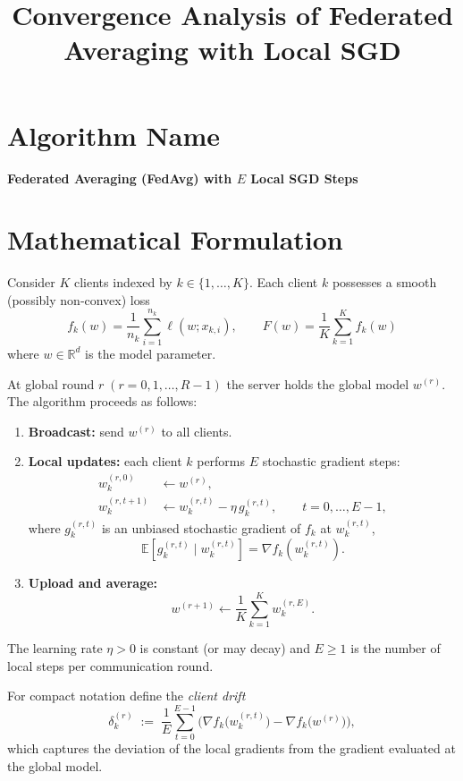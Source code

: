 \documentclass{article}
\title{Convergence Analysis of Federated Averaging with Local SGD}
\author{}
\date{}
\newcommand{\E}{\mathbb{E}}
\newcommand{\R}{\mathbb{R}}
\begin{document}
\maketitle

\section*{Algorithm Name}
\textbf{Federated Averaging (FedAvg) with $E$ Local SGD Steps}

\section*{Mathematical Formulation}
Consider $K$ clients indexed by $k\in\{1,\dots,K\}$.  
Each client $k$ possesses a smooth (possibly non‑convex) loss
\[
f_k(w)=\frac{1}{n_k}\sum_{i=1}^{n_k}\ell(w;x_{k,i}),
\qquad 
F(w)=\frac{1}{K}\sum_{k=1}^{K}f_k(w)
\]
where $w\in\R^d$ is the model parameter.  

At global round $r\;(r=0,1,\dots,R-1)$ the server holds the global model
$w^{(r)}$.  The algorithm proceeds as follows:

\begin{enumerate}[label=\arabic*)]
\item \textbf{Broadcast:} send $w^{(r)}$ to all clients.
\item \textbf{Local updates:} each client $k$ performs $E$ stochastic gradient
steps:
\[
\begin{aligned}
w_{k}^{(r,0)} &\gets w^{(r)},\\
w_{k}^{(r,t+1)} &\gets w_{k}^{(r,t)} - \eta \, g_{k}^{(r,t)},
\qquad t=0,\dots,E-1,
\end{aligned}
\]
where $g_{k}^{(r,t)}$ is an unbiased stochastic gradient of $f_k$ at
$w_{k}^{(r,t)}$,
\[
\E\!\left[g_{k}^{(r,t)}\mid w_{k}^{(r,t)}\right]=\nabla f_k\!\left(w_{k}^{(r,t)}\right).
\]
\item \textbf{Upload and average:}
\[
w^{(r+1)} \gets \frac{1}{K}\sum_{k=1}^{K} w_{k}^{(r,E)} .
\]
\end{enumerate}
The learning rate $\eta>0$ is constant (or may decay) and $E\ge1$ is the
number of local steps per communication round.

For compact notation define the \emph{client drift}
\[
\delta_k^{(r)}\;:=\;\frac{1}{E}\sum_{t=0}^{E-1}
\bigl(\nabla f_k\!\bigl(w_{k}^{(r,t)}\bigr)-\nabla f_k\!\bigl(w^{(r)}\bigr)\bigr),
\]
which captures the deviation of the local gradients from the
gradient evaluated at the global model.
\end{document}
